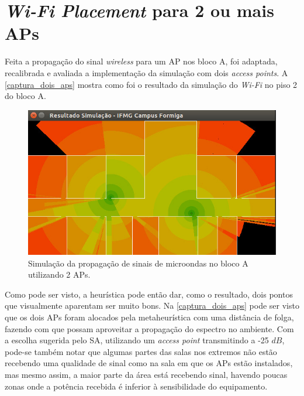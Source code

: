 \documentclass[
	12pt,				%
	twoside,			%
	a4paper,			%
	english,			%
	french,				%
	spanish,			%
	brazil				%
	]{abntex2}
\begin{document}
\section{\texorpdfstring{\emph{Wi-Fi Placement} para 2 ou mais
APs}{Wi-Fi Placement para 2 ou mais APs}}\label{wi-fi-placement-para-2-ou-mais-aps}

Feita a propagação do sinal \emph{wireless} para um AP nos bloco A, foi
adaptada, recalibrada e avaliada a implementação da simulação com dois
\emph{access points}. A \autoref{captura_dois_aps} mostra como foi o
resultado da simulação do \emph{Wi-Fi} no piso 2 do bloco A.

\begin{figure}[ht]
    \caption{\label{captura_dois_aps} Simulação da propagação de sinais de microondas no bloco A utilizando 2 APs.
    }
    \begin{center}
        \includegraphics[scale=0.6]{imagens/captura-2-aps-2.jpg}
    \end{center}
\end{figure}

Como pode ser visto, a heurística pode então dar, como o resultado, dois
pontos que visualmente aparentam ser muito bons. Na
\autoref{captura_dois_aps} pode ser visto que os dois APs foram alocados
pela metaheurística com uma distância de folga, fazendo com que possam
aproveitar a propagação do espectro no ambiente. Com a escolha sugerida
pelo SA, utilizando um \emph{access point} transmitindo a -25 \(dB\),
pode-se também notar que algumas partes das salas nos extremos não estão
recebendo uma qualidade de sinal como na sala em que os APs estão
instalados, mas mesmo assim, a maior parte da área está recebendo sinal,
havendo poucas zonas onde a potência recebida é inferior à sensibilidade
do equipamento.
\end{document}
